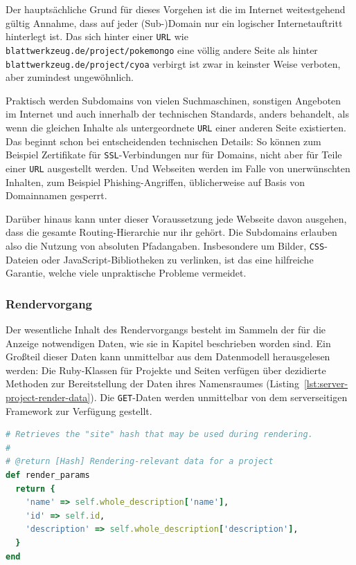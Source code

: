 Der hauptsächliche Grund für dieses Vorgehen ist die im Internet weitestgehend gültig Annahme, dass auf jeder (Sub-)Domain nur ein logischer Internetauftritt hinterlegt ist. Das sich hinter einer \texttt{URL} wie \texttt{blatt\-werk\-zeug.de\-/project\-/pokemongo} eine völlig andere Seite als hinter \texttt{blatt\-werk\-zeug.de\-/project\-/cyoa} verbirgt ist zwar in keinster Weise verboten, aber zumindest ungewöhnlich.

Praktisch werden Subdomains von vielen Suchmaschinen, sonstigen Angeboten im Internet und auch innerhalb der technischen Standards, anders behandelt, als wenn die gleichen Inhalte als untergeordnete \texttt{URL} einer anderen Seite existierten. Das beginnt schon bei entscheidenden technischen Details: So können zum Beispiel Zertifikate für \texttt{SSL}-Verbindungen nur für Domains, nicht aber für Teile einer \texttt{URL} ausgestellt werden. Und Webseiten werden im Falle von unerwünschten Inhalten, zum Beispiel Phishing-Angriffen, üblicherweise auf Basis von Domainnamen gesperrt.

Darüber hinaus kann unter dieser Voraussetzung jede Webseite davon ausgehen, dass die gesamte Routing-Hierarchie nur ihr gehört. Die Subdomains erlauben also die Nutzung von absoluten Pfadangaben. Insbesondere um Bilder, \texttt{CSS}-Dateien oder JavaScript-Bibliotheken zu verlinken, ist das eine hilfreiche Garantie, welche viele unpraktische Probleme vermeidet.

\subsubsection{Rendervorgang}

Der wesentliche Inhalt des Rendervorgangs besteht im Sammeln der für die Anzeige notwendigen Daten, wie sie in Kapitel  beschrieben worden sind. Ein Großteil dieser Daten kann unmittelbar aus dem Datenmodell herausgelesen werden: Die Ruby-Klassen für Projekte und Seiten verfügen über dezidierte Methoden zur Bereitstellung der Daten ihres Namensraumes (Listing~\ref{lst:server-project-render-data}). Die \texttt{GET}-Daten werden unmittelbar von dem serverseitigen Framework zur Verfügung gestellt.

\begin{lstlisting}[float=h, language=Ruby, caption={Bereitstellung der Renderdaten in der Projektklasse}, label={lst:server-project-render-data}]
# Retrieves the "site" hash that may be used during rendering.
#
# @return [Hash] Rendering-relevant data for a project
def render_params
  return {
    'name' => self.whole_description['name'],
    'id' => self.id,
    'description' => self.whole_description['description'],
  }
end
\end{lstlisting}

